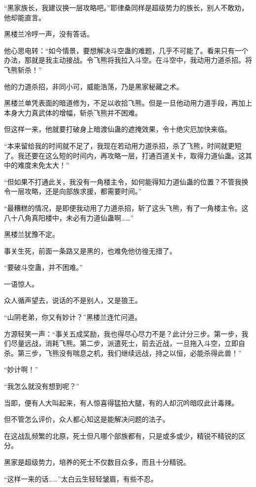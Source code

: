 \begin{this_body}
“黑家族长，我建议换一层攻略吧。”耶律桑同样是超级势力的族长，别人不敢劝，他却能直言。

黑楼兰冷哼一声，没有答话。

他心思电转：“如今情景，要想解决斗空蛊的难题，几乎不可能了。看来只有一个办法，那就是我主动接战。令飞熊将我拉入斗空。在斗空中，我动用力道杀招。将飞熊斩杀！”

他的力道杀招，非同小可，威能浩荡，乃是黑家秘藏之术。

黑楼兰单凭表面的暗道修为，不足以收拾飞熊。但是一旦他动用力道手段，再加上本身大力真武体的增幅，斩杀飞熊并不困难。

但这样一来，他就要打破身上暗渡仙蛊的遮掩效果，令十绝灾厄加快来临。

“本来留给我的时间就不足了，我现在若动用力道杀招，杀了飞熊，时间就更短了。我还要在这么短的时间内，再攻略一层，打通百道关卡，取得力道仙蛊。这其中的难度未免太大！”

“但如果不打通此关，我没有一角楼主令，如何能得知力道仙蛊的位置？不管我换令一层攻略，还是向部族求援，都需要时间。”

“最糟糕的情况，是即便我动用了力道杀招，斩了这头飞熊，有了一角楼主令。这八十八角真阳楼中，未必有力道仙蛊啊……”

黑楼兰犹豫不定。

事关生死，前面一条路又是黑的，也难免他彷徨无措了。

“要破斗空蛊，并不困难。”

一语惊人。

众人循声望去，说话的不是别人，又是狼王。

“山阴老弟，你又有妙计？”黑楼兰连忙问道。

方源轻笑一声：“事关五成奖励，我也得尽心尽力不是？此计分三步。第一步，我们尽量远战，消耗飞熊。第二步，派遣死士，前去近战，一旦拖入斗空，立即自杀。第三步，飞熊没有喘息之机，我们继续远战，持之以恒，必能杀得此兽！”

“妙计啊！”

“我怎么就没有想到呢？”

当即，便有人大叫起来，有人惊喜得猛拍大腿，有的人却沉吟暗叹此计毒辣。

但不管怎么评价，众人都心知这是能解决问题的法子。

在这战乱频繁的北原，死士但凡哪个部族都有，只是或多或少，精锐不精锐的区分。

黑家是超级势力，培养的死士不仅数目众多，而且十分精锐。

“这样一来的话……”太白云生轻轻皱眉，有些不忍。


\end{this_body}
